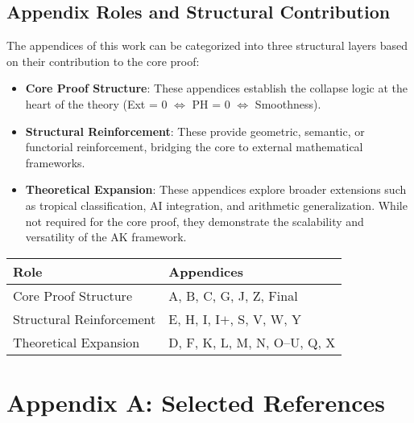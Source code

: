 \documentclass[11pt]{article}
\begin{document}
\subsection*{Appendix Roles and Structural Contribution}

The appendices of this work can be categorized into three structural layers based on their contribution to the core proof:

\begin{itemize}
  \item \textbf{Core Proof Structure}: These appendices establish the collapse logic at the heart of the theory (Ext = 0 $\Leftrightarrow$ PH = 0 $\Leftrightarrow$ Smoothness).
  \item \textbf{Structural Reinforcement}: These provide geometric, semantic, or functorial reinforcement, bridging the core to external mathematical frameworks.
  \item \textbf{Theoretical Expansion}: These appendices explore broader extensions such as tropical classification, AI integration, and arithmetic generalization. While not required for the core proof, they demonstrate the scalability and versatility of the AK framework.
\end{itemize}

\vspace{1em}

\begin{center}
\begin{tabular}{ll}
\toprule
\textbf{Role} & \textbf{Appendices} \\
\midrule
Core Proof Structure & A, B, C, G, J, Z, Final \\
Structural Reinforcement & E, H, I, I$+$, S, V, W, Y \\
Theoretical Expansion & D, F, K, L, M, N, O--U, Q, X \\
\bottomrule
\end{tabular}
\end{center}




\section*{Appendix A: Selected References}
\end{document}
